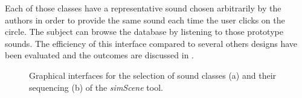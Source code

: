 \documentclass[preprint,12pt]{elsarticle}
\newcommand{\myfloatalign}{\centering}
\begin{document}

Each of those classes have a representative sound chosen arbitrarily by the authors in order to provide the same sound each time the user clicks on the circle. The subject can browse the database by listening to those prototype sounds. The efficiency of this interface compared to several others designs have been evaluated and the outcomes are discussed in \cite{lafay2016JAES}.

\begin{figure}[t]
        \myfloatalign
         \par
       \caption{Graphical interfaces for the selection of sound classes (a) and their sequencing (b) of the \emph{simScene} tool.}
\end{figure}
\end{document}
